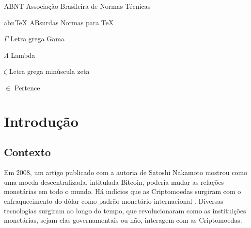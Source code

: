 \documentclass[
article,			%
12pt,				%
openright,			%
oneside,			%
a4paper,			%
chapter=TITLE,		%
section=TITLE,		%
subsection=TITLE,	%
subsubsection=TITLE,%
subsubsubsection=TITLE, %
english,			%
brazil,				%
]{abntex2}
\begin{document}

\listoffigures*
\cleardoublepage

\listoftables*
\cleardoublepage

\begin{siglas}
\item[ABNT] Associação Brasileira de Normas Técnicas
\item[abnTeX] ABsurdas Normas para TeX
\end{siglas}

\begin{simbolos}
\item[$ \Gamma $] Letra grega Gama
\item[$ \Lambda $] Lambda
\item[$ \zeta $] Letra grega minúscula zeta
\item[$ \in $] Pertence
\end{simbolos}

\tableofcontents*
\cleardoublepage


\textual

\section{Introdução}

\subsection{Contexto}

Em 2008, um artigo publicado com a autoria de Satoshi Nakamoto mostrou
como uma moeda descentralizada, intitulada Bitcoin, poderia mudar as
relações monetárias em todo o mundo. Há indícios que as Criptomoedas
surgiram com o enfraquecimento do dólar como padrão monetário
internacional \cite{FAE2014}. Diversas tecnologias surgiram ao longo
do tempo, que revolucionaram como as instituições monetárias, sejam
elas governamentais ou não, interagem com as Criptomoedas.
\end{document}
